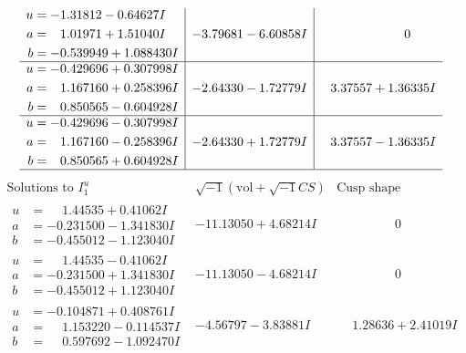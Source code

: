 \documentclass[1p]{elsarticle_modified}
\theoremstyle{definition}
\newcommand{\I}{\sqrt{-1}}
\begin{document}
$$\begin{array}{c|c|c}
\begin{aligned}
u &= -1.31812 - 0.64627 I \\
a &= \phantom{-}1.01971 + 1.51040 I \\
b &= -0.539949 + 1.088430 I\end{aligned}
 & -3.79681 - 6.60858 I & \phantom{-0.000000 } 0 \\ \hline\begin{aligned}
u &= -0.429696 + 0.307998 I \\
a &= \phantom{-}1.167160 + 0.258396 I \\
b &= \phantom{-}0.850565 - 0.604928 I\end{aligned}
 & -2.64330 - 1.72779 I & \phantom{-}3.37557 + 1.36335 I \\ \hline\begin{aligned}
u &= -0.429696 - 0.307998 I \\
a &= \phantom{-}1.167160 - 0.258396 I \\
b &= \phantom{-}0.850565 + 0.604928 I\end{aligned}
 & -2.64330 + 1.72779 I & \phantom{-}3.37557 - 1.36335 I\\
 \hline 
 \end{array}$$\newpage$$\begin{array}{c|c|c}  
\text{Solutions to }I^u_{1}& \I (\text{vol} + \sqrt{-1}CS) & \text{Cusp shape}\\
 \hline 
\begin{aligned}
u &= \phantom{-}1.44535 + 0.41062 I \\
a &= -0.231500 - 1.341830 I \\
b &= -0.455012 - 1.123040 I\end{aligned}
 & -11.13050 + 4.68214 I & \phantom{-0.000000 } 0 \\ \hline\begin{aligned}
u &= \phantom{-}1.44535 - 0.41062 I \\
a &= -0.231500 + 1.341830 I \\
b &= -0.455012 + 1.123040 I\end{aligned}
 & -11.13050 - 4.68214 I & \phantom{-0.000000 } 0 \\ \hline\begin{aligned}
u &= -0.104871 + 0.408761 I \\
a &= \phantom{-}1.153220 - 0.114537 I \\
b &= \phantom{-}0.597692 - 1.092470 I\end{aligned}
 & -4.56797 - 3.83881 I & \phantom{-}1.28636 + 2.41019 I \\ \hline\begin{aligned}

\end{aligned}
\end{array}$$
\end{document}
